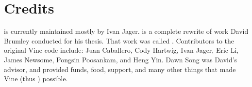 \chapter{Credits}
\bap is currently maintained mostly by Ivan Jager.  \bap is a complete
rewrite of work David Brumley conducted for his thesis. That work was
called \vine. Contributors to the original Vine code include: Juan
Caballero, Cody Hartwig, Ivan Jager, Eric Li, James Newsome, Pongsin
Poosankam, and Heng Yin. Dawn Song was David's advisor, and provided
funds, food, support, and many other things that made Vine (thus \bap)
possible.


